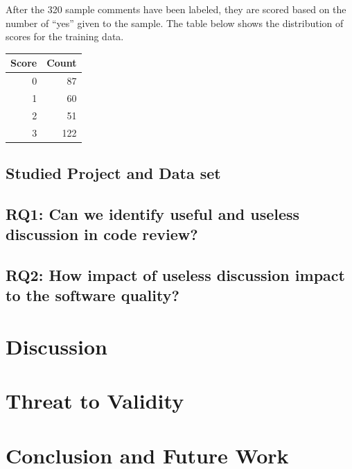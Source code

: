 \documentclass[conference]{IEEEtran}
\begin{document}
After the 320 sample comments have been labeled,
they are scored based on the number of ``yes'' given to the sample.
The table below shows the distribution of scores for the training data.


\begin{center}
\begin{tabular}{|r|r|}
\hline
\bfseries Score & \bfseries Count \\
\hline
0 & 87 \\ 1 & 60 \\ 2 & 51 \\ 3 & 122 \\
\hline
\end{tabular}
\end{center}






\subsection{Studied Project and Data set}
\subsection{RQ1: Can we identify useful and useless discussion in code review?}
\subsection{RQ2: How impact of useless discussion impact to the software quality?}


\section{Discussion}



\section{Threat to Validity}


\section{Conclusion and Future Work}


\IEEEpeerreviewmaketitle







\end{document}
